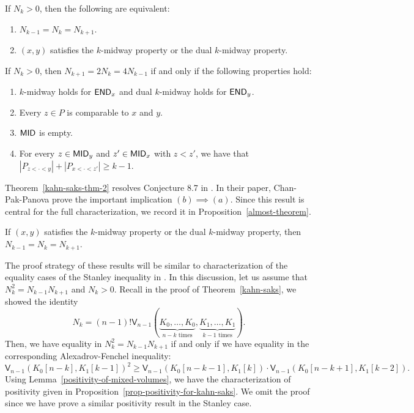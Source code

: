 \documentclass{puthesis-UG}
\begin{document}
\begin{thm} \label{kahn-saks-thm-2}
	If $N_k > 0$, then the following are equivalent:
	\begin{enumerate}[label = (\alph*)]
		\item $N_{k-1} = N_k = N_{k+1}$.
		\item $(x, y)$ satisfies the $k$-midway property or the dual $k$-midway property. 
	\end{enumerate}
\end{thm}

\begin{thm} \label{kahn-saks-thm-3}
	If $N_k > 0$, then $N_{k+1} = 2N_k = 4N_{k-1}$ if and only if the following properties hold: 
	\begin{enumerate}[label = (\roman*)]
		\item $k$-midway holds for $\mathsf{END}_x$ and dual $k$-midway holds for $\mathsf{END}_y$.  
		\item Every $z \in P$ is comparable to $x$ and $y$. 
		\item $\mathsf{MID}$ is empty. 
		\item For every $z \in \mathsf{MID}_y$ and $z' \in \mathsf{MID}_x$ with $z < z'$, we have that $|P_{z < \cdot < y}| + |P_{x < \cdot < z'}| \geq k-1$. 
	\end{enumerate}
\end{thm}

\begin{remark}
	Theorem~\ref{kahn-saks-thm-2} resolves Conjecture 8.7 in \cite{chan2022extensions}. In their paper, Chan-Pak-Panova prove the important implication $(b) \implies (a)$. Since this result is central for the full characterization, we record it in Proposition~\ref{almost-theorem}.
\end{remark}

\begin{prop} \label{almost-theorem}
	If $(x, y)$ satisfies the $k$-midway property or the dual $k$-midway property, then $N_{k-1} = N_k = N_{k+1}$. 
\end{prop}

The proof strategy of these results will be similar to characterization of the equality cases of the Stanley inequality in \cite{shenfeld2022extremals}. In this discussion, let us assume that $N_k^2 = N_{k-1} N_{k+1}$ and $N_k > 0$. Recall in the proof of Theorem~\ref{kahn-saks}, we showed the identity 
\[
	N_k = (n-1)! \mathsf{V}_{n-1} \left ( \underbrace{K_0, \ldots, K_0}_{n-k \text{ times}}, \underbrace{K_1, \ldots, K_1}_{k-1 \text{ times}} \right ).
\]
Then, we have equality in $N_k^2 = N_{k-1} N_{k+1}$ if and only if we have equality in the corresponding Alexadrov-Fenchel inequality:
\[
	\mathsf{V}_{n-1}(K_0[n-k], K_1[k-1])^2 \geq \mathsf{V}_{n-1} (K_0[n-k-1], K_1[k]) \cdot \mathsf{V}_{n-1} (K_0[n-k+1], K_1[k-2]).
\]
Using Lemma~\ref{positivity-of-mixed-volumes}, we have the characterization of positivity given in Proposition~\ref{prop-positivity-for-kahn-saks}. We omit the proof since we have prove a similar positivity result in the Stanley case. 
\end{document}
